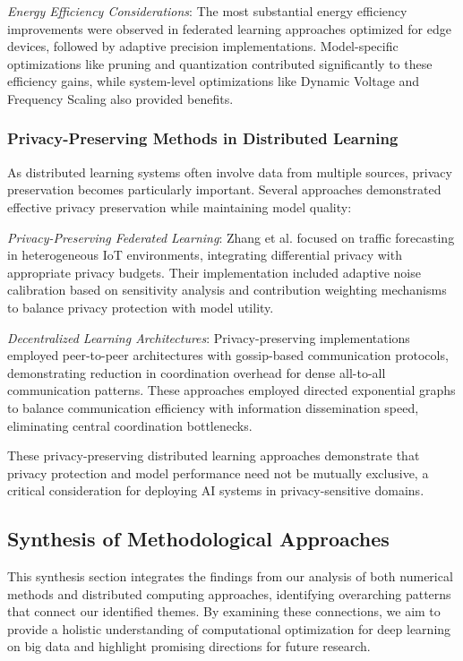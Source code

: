 \textit{Energy Efficiency Considerations}: The most substantial energy efficiency improvements were observed in federated learning approaches optimized for edge devices, followed by adaptive precision implementations. Model-specific optimizations like pruning and quantization contributed significantly to these efficiency gains, while system-level optimizations like Dynamic Voltage and Frequency Scaling also provided benefits.

\subsubsection{Privacy-Preserving Methods in Distributed Learning}
As distributed learning systems often involve data from multiple sources, privacy preservation becomes particularly important. Several approaches demonstrated effective privacy preservation while maintaining model quality:

\textit{Privacy-Preserving Federated Learning}: Zhang et al. \citep{Zhang20229876} focused on traffic forecasting in heterogeneous IoT environments, integrating differential privacy with appropriate privacy budgets. Their implementation included adaptive noise calibration based on sensitivity analysis and contribution weighting mechanisms to balance privacy protection with model utility.

\textit{Decentralized Learning Architectures}: Privacy-preserving implementations employed peer-to-peer architectures with gossip-based communication protocols, demonstrating reduction in coordination overhead for dense all-to-all communication patterns. These approaches employed directed exponential graphs to balance communication efficiency with information dissemination speed, eliminating central coordination bottlenecks.

These privacy-preserving distributed learning approaches demonstrate that privacy protection and model performance need not be mutually exclusive, a critical consideration for deploying AI systems in privacy-sensitive domains.

\subsection{Synthesis of Methodological Approaches}
This synthesis section integrates the findings from our analysis of both numerical methods and distributed computing approaches, identifying overarching patterns that connect our identified themes. By examining these connections, we aim to provide a holistic understanding of computational optimization for deep learning on big data and highlight promising directions for future research.

